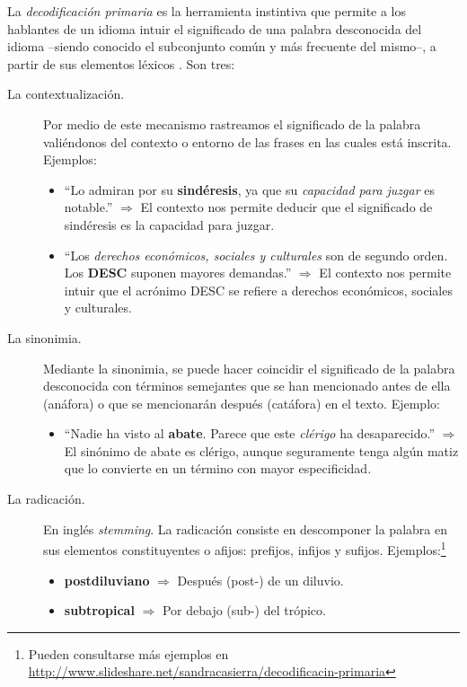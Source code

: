 La \emph{decodificación primaria} es la herramienta instintiva que permite a los hablantes de un idioma intuir el significado de una palabra desconocida del idioma --siendo conocido el subconjunto común y más frecuente del mismo--, a partir de sus elementos léxicos \citep{Zubira2002}. Son tres:
\nopagebreak
\begin{description}
\item[La contextualización.] Por medio de este mecanismo rastreamos el significado de la palabra valiéndonos del contexto o entorno de las frases en las cuales está inscrita. Ejemplos:
\nopagebreak
\begin{itemize}
\item ``Lo admiran por su \textbf{sindéresis}, ya que su \emph{capacidad para juzgar} es notable.'' $\Longrightarrow$ El contexto nos permite deducir que el significado de sindéresis es la capacidad para juzgar.
\item ``Los \emph{derechos económicos, sociales y culturales} son de segundo orden. Los \textbf{DESC} suponen mayores demandas.'' $\Longrightarrow$ El contexto nos permite intuir que el acrónimo DESC se refiere a derechos económicos, sociales y culturales.
\end{itemize}
%
\item[La sinonimia.] Mediante la sinonimia, se puede hacer coincidir el significado de la palabra desconocida con términos semejantes que se han mencionado antes de ella (anáfora) o que se mencionarán después (catáfora) en el texto. Ejemplo:
\nopagebreak
\begin{itemize}
\item ``Nadie ha visto al \textbf{abate}. Parece que este \emph{clérigo} ha desaparecido.'' $\Longrightarrow$ El sinónimo de abate es clérigo, aunque seguramente tenga algún matiz que lo convierte en un término con mayor especificidad.
\end{itemize}
%
\item[La radicación.] En inglés \emph{stemming}. La radicación consiste en descomponer la palabra en sus elementos constituyentes o afijos: prefijos, infijos y sufijos. Ejemplos:\footnote{Pueden consultarse más ejemplos en \url{http://www.slideshare.net/sandracasierra/decodificacin-primaria}}
\nopagebreak
\begin{itemize}
\item \textbf{postdiluviano} $\Longrightarrow$ Después (post-) de un diluvio.
\item \textbf{subtropical}  $\Longrightarrow$ Por debajo (sub-) del trópico.
\end{itemize}
\end{description}

